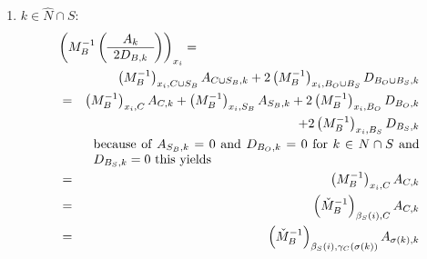 \documentclass[a4paper]{article}
\begin{document}
\begin{enumerate}
\item $k \in \hat{N} \cap S$:
\begin{eqnarray}
\label{eq:r1_i_B_S_k_N_S}
\lefteqn{\left(M_{B}^{-1}
           \left(\begin{array}{c}
                   A_{k} \\
	           \hline
	           2D_{B, k}
	         \end{array}
           \right)
         \right)_{x_{i}}
=} \nonumber \\
&&
\left(M_{B}^{-1}\right)_{x_{i}, C \cup S_{B}}A_{C \cup S_{B}, k}
+2\left(M_{B}^{-1}\right)_{x_{i}, B_{O} \cup B_{S}}D_{B_{O} \cup B_{S}, k}
\nonumber \\
&=&
\left(M_{B}^{-1}\right)_{x_{i}, C}A_{C, k}
+\left(M_{B}^{-1}\right)_{x_{i}, S_{B}}A_{S_{B}, k}
+2\left(M_{B}^{-1}\right)_{x_{i}, B_{O}}D_{B_{O}, k}
\nonumber \\
&&
+2\left(M_{B}^{-1}\right)_{x_{i}, B_{S}}D_{B_{S}, k}
\nonumber \\
&&\begin{minipage}{9cm}
because of $A_{S_{B},k}=0$ and $D_{B_{O}, k}=0$ for
$k \in N \cap S$ and $D_{B_{S}, k}=0$ this yields
\end{minipage}
\nonumber \\
&=&
\left(M_{B}^{-1}\right)_{x_{i}, C}A_{C, k}
\nonumber \\
&=&
\left(\check{M}_{B}^{-1}\right)_{\beta_{S}(i), C}A_{C, k}
\nonumber \\
&=&
\left(\check{M}_{B}^{-1}\right)_{\beta_{S}(i), \gamma_{C}(\sigma(k))}
  A_{\sigma(k), k}
\end{eqnarray}


\end{enumerate}
\end{document}
